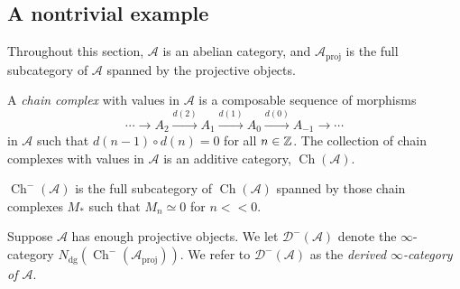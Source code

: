 \documentclass{MetricNotes2023}
\def\inte{\ensuremath\mathbb{Z}}
\DeclareMathOperator{\Ch}{Ch}
\begin{document}
\begin{ourproof}
\section{A nontrivial example}

Throughout this section, \(\mathcal{A}\) is an abelian category, and \(\mathcal{A}_{\text{proj}}\) is the full subcategory of \(\mathcal{A}\) spanned by the projective objects. 

\begin{definition}
A \textit{chain complex} with values in \(\mathcal{A}\) is a composable sequence of morphisms 
\[\cdots \to A_2 \xrightarrow{d(2)} A_1 \xrightarrow{d(1)}A_0 \xrightarrow{d(0)} A_{-1}\to \cdots\]
in \(\mathcal{A}\) such that \(d(n-1)\circ d(n)=0\) for all \(n \in \inte\). The collection of chain complexes with values in \(\mathcal{A}\) is an additive category, \(\Ch(\mathcal{A})\). 
\end{definition}

\begin{definition}
\(\Ch^-(\mathcal{A})\) is the full subcategory of \(\Ch(\mathcal{A})\) spanned by those chain complexes \(M_*\) such that \(M_n \simeq 0\) for \(n << 0\). 
\end{definition}

\begin{definition}
Suppose \(\mathcal{A}\) has enough projective objects. We let \(\mathcal{D}^-(\mathcal{A})\) denote the \(\infty\)-category \(N_{\text{dg}}(\Ch^-(\mathcal{A}_{\text{proj}}))\). We refer to \(\mathcal{D}^-(\mathcal{A})\) as the \textit{derived \(\infty\)-category of \(\mathcal{A}\)}.  
\end{definition}



\end{ourproof}
\end{document}

